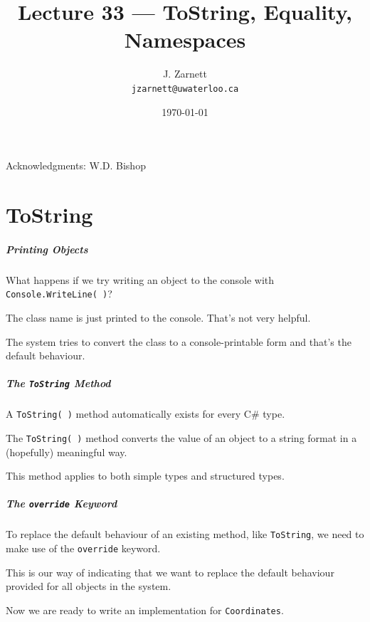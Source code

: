 

\title{Lecture 33 --- ToString, Equality, Namespaces}

\author{J. Zarnett\\
\texttt{jzarnett@uwaterloo.ca}}
\date{\today}



\begin{frame}
  \titlepage
  
  \begin{center}
  \small{Acknowledgments: W.D. Bishop}
  \end{center}
\end{frame}

\part{ToString}
\begin{frame}\partpage\end{frame}


\begin{frame}
\frametitle{Printing Objects}

What happens if we try writing  an object to the console with \texttt{Console.WriteLine( )}?

The class name is just printed to the console. That's not very helpful.

The system tries to convert the class to a console-printable form and that's the default behaviour. 

\end{frame}

\begin{frame}
\frametitle{The \texttt{ToString} Method}
A \texttt{ToString( )} method automatically exists for every C\# type.

The \texttt{ToString( )} method converts the value of an object to a string format in a (hopefully) meaningful way.

This method applies to both simple types and structured types.
\end{frame}

\begin{frame}
\frametitle{The \texttt{override} Keyword}
To replace the default behaviour of an existing method, like \texttt{ToString}, we need to make use of the \alert{\texttt{override}} keyword.

This is our way of indicating that we want to replace the default behaviour provided for all objects in the system.

Now we are ready to write an implementation for \texttt{Coordinates}.

\end{frame}



